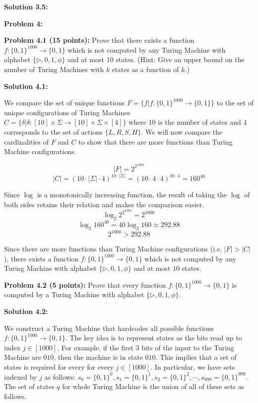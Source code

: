 \documentclass[11pt]{article}
\begin{document}
\textbf{Solution 3.5:} 

\newpage

\textbf{Problem 4:} 

\textbf{Problem 4.1 (15 points):} Prove that there exists a function $f: \{0,1\}^{1000} \to \{0,1\}$ which is not computed by any Turing Machine with alphabet $\{\triangleright, 0,1,\phi\}$ and at most $10$ states. (Hint: Give an upper bound on the number of Turing Machines with $k$ states as a function of $k$.)

\textbf{Solution 4.1:} 

We compare the set of unique functions $F = \{f|f: \{0,1\}^{1000} \to \{0,1\}\}$ to the set of unique configurations of Turing Machines $C = \{\delta | \delta: [10] \times \Sigma \to [10] \times \Sigma \times [4]\}$ where 10 is the number of states and 4 corresponds to the set of actions $\{L, R, S, H\}$. We will now compare the cardinalities of $F$ and $C$ to show that there are more functions than Turing Machine configurations.

$$
|F| = 2^{2^{1000}}
$$
$$
|C| = (10\cdot |\Sigma| \cdot 4)^{10\cdot |\Sigma|} = (10\cdot 4\cdot 4)^{10\cdot 4} = 160^{40}
$$

Since $\log$ is a monotonically increasing function, the result of taking the $\log$ of both sides retains their relation and makes the comparison easier.
$$
\log_2{2^{2^{1000}}} = 2^{1000}
$$
$$
\log_2{160^{40}} = 40\log_2{160} \approx 292.88
$$
$$
2^{1000} > 292.88
$$

Since there are more functions than Turing Machine configurations (i.e. $|F| > |C|$), there exists a function $f: \{0,1\}^{1000} \to \{0,1\}$ which is not computed by any Turing Machine with alphabet $\{\triangleright, 0,1,\phi\}$ and at most $10$ states.

\newpage

\textbf{Problem 4.2 (5 points):} Prove that every function $f: \{0,1\}^{1000} \to \{0,1\}$ is computed by a Turing Machine with alphabet $\{\triangleright, 0,1,\phi\}$.

\textbf{Solution 4.2:} 

We construct a Turing Machine that hardcodes all possible functions $f: \{0,1\}^{1000} \to \{0,1\}$. The key idea is to represent states as the bits read up to index $j \in [1000]$. For example, if the first 3 bits of the input to the Turing Machine are $010$, then the machine is in state $010$. This implies that a set of states is required for every for every $j \in [1000]$. In particular, we have sets indexed by $j$ as follows: $s_0 = \{0, 1\}^0, s_1 = \{0, 1\}^1, s_2 = \{0, 1\}^2, \cdots, s_{999} = \{0, 1\}^{999}$. The set of states $q$ for whole Turing Machine is the union of all of these sets as follows.
\end{document}
